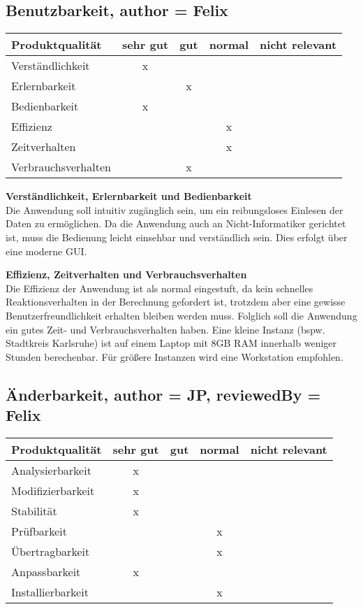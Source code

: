 \documentclass[parskip=full]{scrartcl} %
\begin{document}
\subsection{Benutzbarkeit, author = Felix}

    \begin{tabular}{|l| c| c| c| c|}
    \hline
        Produktqualität & sehr gut & gut & normal & nicht relevant \\
    \hline
        Verständlichkeit & x & & &\\
    \hline
        Erlernbarkeit & & x & &\\
    \hline
        Bedienbarkeit & x & & &\\
    \hline
        Effizienz & & & x &\\
    \hline
        Zeitverhalten & & & x &\\
    \hline
        Verbrauchsverhalten & & x & &\\
    \hline
    \end{tabular}

\textbf{Verständlichkeit, Erlernbarkeit und Bedienbarkeit}\\
Die Anwendung soll intuitiv zugänglich sein, um ein reibungsloses Einlesen der Daten zu ermöglichen. Da die Anwendung auch an Nicht-Informatiker gerichtet ist, muss die Bedienung leicht einsehbar und verständlich sein. Dies erfolgt über eine moderne GUI.

\textbf{Effizienz, Zeitverhalten und Verbrauchsverhalten}\\
Die Effizienz der Anwendung ist als normal eingestuft, da kein schnelles Reaktionsverhalten in der Berechnung gefordert ist, trotzdem aber eine gewisse Benutzerfreundlichkeit erhalten bleiben werden muss. Folglich soll die Anwendung ein gutes Zeit- und Verbrauchsverhalten haben.
Eine kleine Instanz (bspw. Stadtkreis Karlsruhe) ist auf einem Laptop mit 8GB RAM innerhalb weniger Stunden berechenbar. Für größere Instanzen wird eine Workstation empfohlen.


\newpage 


\subsection{Änderbarkeit, author = JP, reviewedBy = Felix}
    \begin{tabular}{|l| c| c| c| c|}
    \hline
        Produktqualität & sehr gut & gut & normal & nicht relevant \\
    \hline
        Analysierbarkeit & x & & & \\
    \hline
        Modifizierbarkeit & x & & &\\
    \hline
        Stabilität & x & & &\\
    \hline
        Prüfbarkeit & & & x &\\
    \hline
        Übertragbarkeit & & & x &\\
    \hline
        Anpassbarkeit & x & & &\\
    \hline
        Installierbarkeit & & & x &\\
    \hline
    \end{tabular}
    
\end{document}

